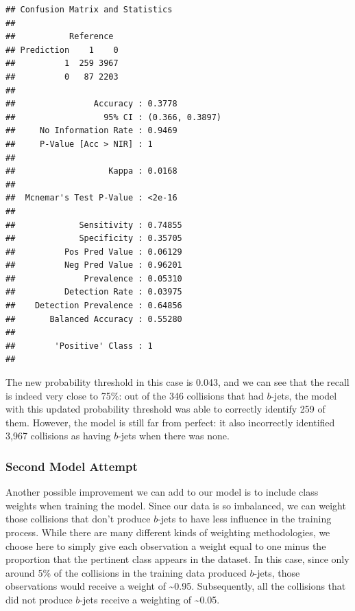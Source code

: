 \documentclass[
]{article}
\begin{document}
\begin{verbatim}
## Confusion Matrix and Statistics
## 
##           Reference
## Prediction    1    0
##          1  259 3967
##          0   87 2203
##                                          
##                Accuracy : 0.3778         
##                  95% CI : (0.366, 0.3897)
##     No Information Rate : 0.9469         
##     P-Value [Acc > NIR] : 1              
##                                          
##                   Kappa : 0.0168         
##                                          
##  Mcnemar's Test P-Value : <2e-16         
##                                          
##             Sensitivity : 0.74855        
##             Specificity : 0.35705        
##          Pos Pred Value : 0.06129        
##          Neg Pred Value : 0.96201        
##              Prevalence : 0.05310        
##          Detection Rate : 0.03975        
##    Detection Prevalence : 0.64856        
##       Balanced Accuracy : 0.55280        
##                                          
##        'Positive' Class : 1              
## 
\end{verbatim}

The new probability threshold in this case is 0.043, and we can see that
the recall is indeed very close to 75\%: out of the 346 collisions that
had \(b\)-jets, the model with this updated probability threshold was
able to correctly identify 259 of them. However, the model is still far
from perfect: it also incorrectly identified 3,967 collisions as having
\(b\)-jets when there was none.

\hypertarget{second-model-attempt}{%
\subsubsection{Second Model Attempt}\label{second-model-attempt}}

Another possible improvement we can add to our model is to include class
weights when training the model. Since our data is so imbalanced, we can
weight those collisions that don't produce \(b\)-jets to have less
influence in the training process. While there are many different kinds
of weighting methodologies, we choose here to simply give each
observation a weight equal to one minus the proportion that the
pertinent class appears in the dataset. In this case, since only around
5\% of the collisions in the training data produced \(b\)-jets, those
observations would receive a weight of \textasciitilde0.95.
Subsequently, all the collisions that did not produce \(b\)-jets receive
a weighting of \textasciitilde0.05.
\end{document}
